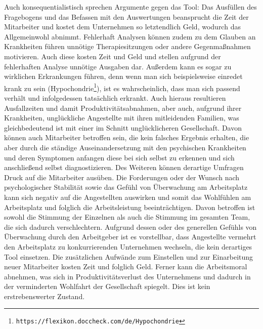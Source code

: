\documentclass[a4paper,12pt,]{article}
\begin{document}
Auch konsequentialistisch sprechen Argumente gegen das Tool: Das Ausfüllen des Fragebogens und das Befassen mit den Auswertungen beansprucht die Zeit der Mitarbeiter und kostet dem Unternehmen so letztendlich Geld, wodurch das Allgemeinwohl abnimmt. Fehlerhaft Analysen können zudem zu dem Glauben an Krankheiten führen unnötige Therapiesitzungen oder andere Gegenmaßnahmen motivieren. Auch diese kosten Zeit und Geld und stellen aufgrund der fehlerhaften Analyse unnötige Ausgaben dar. Außerdem kann es sogar zu wirklichen Erkrankungen führen, denn wenn man sich beispielsweise einredet krank zu sein (Hypochondrie\footnote{\tt https://flexikon.doccheck.com/de/Hypochondrie}), ist es wahrscheinlich, dass man sich passend verhält und infolgedessen tatsächlich erkrankt. Auch hieraus resultieren Ausfallzeiten und damit Produktivitätsabnahmen, aber auch, aufgrund ihrer Krankheiten, unglückliche Angestellte mit ihren mitleidenden Familien, was gleichbedeutend ist mit einer im Schnitt unglücklicheren Gesellschaft.
Davon können auch Mitarbeiter betroffen sein, die kein falsches Ergebnis erhalten, die aber durch die ständige Auseinandersetzung mit den psychischen Krankheiten und deren Symptomen anfangen diese bei sich selbst zu erkennen und sich anschließend selbst diagnostizieren.
 Des Weiteren können derartige Umfragen Druck auf die Mitarbeiter ausüben. Die Forderungen oder der Wunsch nach psychologischer Stabilität sowie das Gefühl von Überwachung am Arbeitsplatz kann sich negativ auf die Angestellten auswirken und somit das Wohlfühlen am Arbeitsplatz und folglich die Arbeitsleistung beeinträchtigen. Davon betroffen ist sowohl die Stimmung der Einzelnen als auch die Stimmung im gesamten Team, die sich dadurch verschlechtern. Aufgrund dessen oder des generellen Gefühls von Überwachung durch den Arbeitgeber ist es vorstellbar, dass Angestellte vermehrt den Arbeitsplatz zu konkurrierenden Unternehmen wechseln, die kein derartiges Tool einsetzen. Die zusätzlichen Aufwände zum Einstellen und zur Einarbeitung neuer Mitarbeiter kosten Zeit und folglich Geld. Ferner kann die Arbeitsmoral abnehmen, was sich in Produktivitätsverlust des Unternehmens und dadurch in der verminderten Wohlfahrt der Gesellschaft spiegelt. Dies ist kein erstrebenswerter Zustand. 
\end{document}
